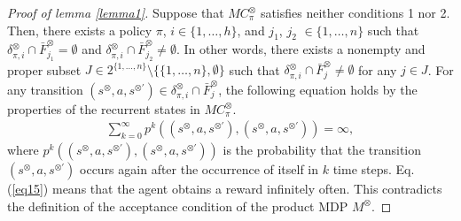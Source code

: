 \documentclass[a4j,12pt,oneside,openany,english]{jsbook}
\begin{document}
\begin{proof}[Proof of lemma \ref{lemma1}]
  Suppose that $MC^{\otimes}_{\pi}$ satisfies neither conditions 1 nor 2. Then, there exists a policy $\pi$, $i \in \{ 1, \ldots ,h \}$, and $j_1$, $j_2$ $\in \{ 1, \ldots ,n \}$ such that $\delta^{\otimes}_{\pi,i} \cap \bar{F}^{\otimes}_{j_1} = \emptyset$ and $\delta^{\otimes}_{\pi,i} \cap \bar{F}^{\otimes}_{j_2} \neq \emptyset$. In other words, there exists a nonempty and proper subset $J \in 2^{\{ 1, \ldots ,n \}} \setminus \{ \{ 1, \ldots ,n \}, \emptyset \}$ such that $ \delta^{\otimes}_{\pi,i} \cap \bar{F}^{\otimes}_j \neq \emptyset $ for any $j \in J$.
   For any transition $ (s^{\otimes},a,s^{\otimes \prime}) \in \delta^{\otimes}_{\pi,i} \cap \bar{F}^{\otimes}_j$, the following equation holds by the properties of the recurrent states in $MC^{\otimes}_{\pi}$\cite{ESS}.
  \begin{align}
    \sum_{k=0}^{\infty} p^k((s^{\otimes},a,s^{\otimes \prime}),(s^{\otimes},a,s^{\otimes \prime})) = \infty,
    \label{eq15}
  \end{align}
  where $p^k((s^{\otimes},a,s^{\otimes \prime}),(s^{\otimes},a,s^{\otimes \prime}))$ is the probability that the transition $(s^{\otimes},a,s^{\otimes \prime})$ occurs again after the occurrence of itself in $k$ time steps. Eq. (\ref{eq15}) means that the agent obtains a reward infinitely often. This contradicts the definition of the acceptance condition of the product MDP $M^{\otimes}$.
\end{proof}
\end{document}
